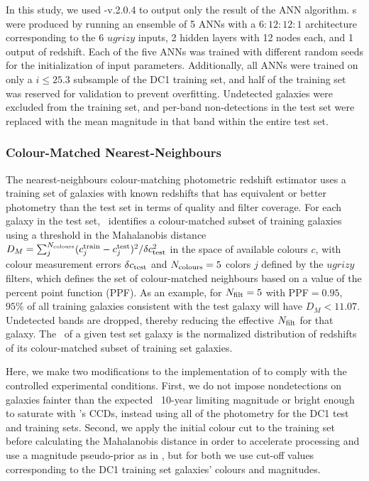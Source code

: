 In this study, we used \annz-v.2.0.4 to output only the result of the ANN algorithm.
\Pzpdf s were produced by running an ensemble of 5 ANNs with a $6:12:12:1$ architecture corresponding to the 6 $ugrizy$ inputs, 2 hidden layers with 12 nodes each, and 1 output of redshift.
Each of the five ANNs was trained with different random seeds for the initialization of input parameters.
Additionally, all ANNs were trained on only a $i \leq 25.3$ subsample of the DC1 training set, and half of the training set was reserved for validation to prevent overfitting.
Undetected galaxies were excluded from the training set, and per-band non-detections in the test set were replaced with the mean magnitude in that band within the entire test set.

\subsubsection{Colour-Matched Nearest-Neighbours}
\label{sec:cmnn}

The nearest-neighbours colour-matching photometric redshift estimator \citep[\cmnn,][]{Graham:17} uses a training set of galaxies with known redshifts that has equivalent or better photometry than the test set in terms of quality and filter coverage.
For each galaxy in the test set, \cmnn\ identifies a colour-matched subset of training galaxies using a threshold in the Mahalanobis distance $D_M = \sum_{j}^{N_{\rm colours}} (c^{\rm train}_{j} - c^{\rm test}_{j})^{2} / \delta c_{\rm test}^2$ in the space of available colours $c$, with colour measurement errors $\delta c_{\rm test}$ and $N_{\rm colours} = 5$ colors $j$ defined by the $ugrizy$ filters, which defines the set of colour-matched neighbours based on a value of the percent point function (PPF).
As an example, for $N_{\rm{filt}}=5$ with PPF$=0.95$, $95\%$ of all training galaxies consistent with the test galaxy will have $D_M < 11.07$.
Undetected bands are dropped, thereby reducing the effective $N_{\rm{filt}}$ for that galaxy.
The \pzpdf\ of a given test set galaxy is the normalized distribution of redshifts of its colour-matched subset of training set galaxies.

Here, we make two modifications to the implementation of \citet{Graham:17} to comply with the controlled experimental conditions.
First, we do not impose nondetections on galaxies fainter than the expected \lsst\ 10-year limiting magnitude or bright enough to saturate with \lsst's CCDs, instead using all of the photometry for the DC1 test and training sets.
Second, we apply the initial colour cut to the training set before calculating the Mahalanobis distance in order to accelerate processing and use a magnitude pseudo-prior as in \citet{Graham:17}, but for both we use cut-off values corresponding to the DC1 training set galaxies' colours and magnitudes.

